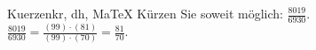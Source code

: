 \begin{MAufgabe}{Kuerzen}{kr, dh, MaTeX}
K\"urzen Sie soweit m\"oglich: $\frac{8019}{6930}$.\\ 
\ifLsg\MLoesung
\quad $\frac{8019}{6930}=\frac{(99)\cdot(81)}{(99)\cdot(70)}=\frac{81}{70}$.\else\relax\fi
 \end{MAufgabe}